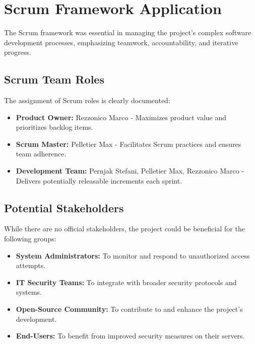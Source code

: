 \documentclass[11pt,a4paper]{article}
\begin{document}
    \section{Scrum Framework Application}\label{sec:scrum-framework-application}
    The Scrum framework was essential in managing the project's complex software development processes, emphasizing teamwork, accountability, and iterative progress.

    \subsection{Scrum Team Roles}\label{subsec:scrum-team-roles}
    The assignment of Scrum roles is clearly documented:

    \begin{itemize}
        \item \textbf{Product Owner:} Rezzonico Marco - Maximizes product value and prioritizes backlog items.
        \item \textbf{Scrum Master:} Pelletier Max - Facilitates Scrum practices and ensures team adherence.
        \item \textbf{Development Team:} Pernjak Stefani, Pelletier Max, Rezzonico Marco - Delivers potentially releasable increments each sprint.
    \end{itemize}

    \subsection{Potential Stakeholders}\label{subsec:potential-stakeholders}
    While there are no official stakeholders, the project could be beneficial for the following groups:

    \begin{itemize}
        \item \textbf{System Administrators:} To monitor and respond to unauthorized access attempts.
        \item \textbf{IT Security Teams:} To integrate with broader security protocols and systems.
        \item \textbf{Open-Source Community:} To contribute to and enhance the project's development.
        \item \textbf{End-Users:} To benefit from improved security measures on their servers.
    \end{itemize}
\end{document}
